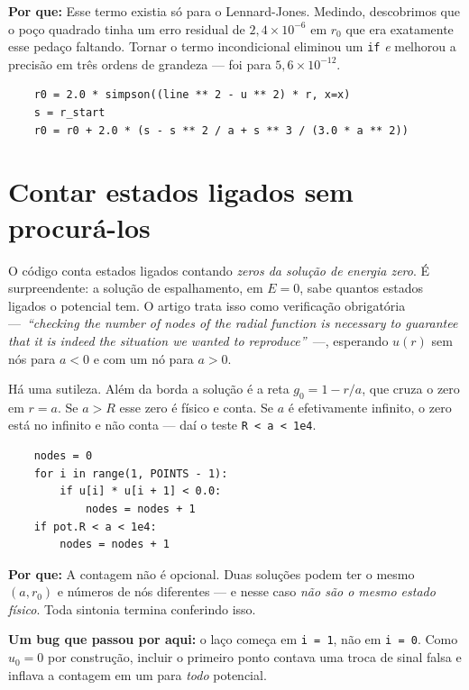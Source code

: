 \documentclass[11pt,a4paper]{article}
\newcommand{\pq}[1]{\medskip\noindent\textbf{Por que:} #1\medskip}
\begin{document}
\pq{Esse termo existia só para o Lennard-Jones. Medindo, descobrimos que o poço
quadrado tinha um erro residual de $2{,}4\times10^{-6}$ em $r_0$ que era
exatamente esse pedaço faltando. Tornar o termo incondicional eliminou um
\texttt{if} \emph{e} melhorou a precisão em três ordens de grandeza --- foi para
$5{,}6\times10^{-12}$.}

\begin{lstlisting}
    r0 = 2.0 * simpson((line ** 2 - u ** 2) * r, x=x)
    s = r_start
    r0 = r0 + 2.0 * (s - s ** 2 / a + s ** 3 / (3.0 * a ** 2))
\end{lstlisting}

\section{Contar estados ligados sem procurá-los}

O código conta estados ligados contando \emph{zeros da solução de energia zero}.
É surpreendente: a solução de espalhamento, em $E=0$, sabe quantos estados
ligados o potencial tem. O artigo trata isso como verificação obrigatória
---~\emph{``checking the number of nodes of the radial function is necessary to
guarantee that it is indeed the situation we wanted to reproduce''}~---,
esperando $u(r)$ sem nós para $a<0$ e com um nó para $a>0$.

Há uma sutileza. Além da borda a solução é a reta $g_0 = 1 - r/a$, que cruza o
zero em $r = a$. Se $a > R$ esse zero é físico e conta. Se $a$ é efetivamente
infinito, o zero está no infinito e não conta --- daí o teste \texttt{R < a < 1e4}.

\begin{lstlisting}
    nodes = 0
    for i in range(1, POINTS - 1):
        if u[i] * u[i + 1] < 0.0:
            nodes = nodes + 1
    if pot.R < a < 1e4:
        nodes = nodes + 1
\end{lstlisting}

\pq{A contagem não é opcional. Duas soluções podem ter o mesmo $(a, r_0)$ e
números de nós diferentes --- e nesse caso \emph{não são o mesmo estado físico}.
Toda sintonia termina conferindo isso.}

\textbf{Um bug que passou por aqui:} o laço começa em \texttt{i = 1}, não em
\texttt{i = 0}. Como $u_0 = 0$ por construção, incluir o primeiro ponto contava
uma troca de sinal falsa e inflava a contagem em um para \emph{todo} potencial.

\end{document}
